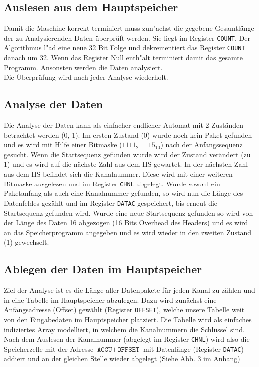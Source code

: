 \documentclass[12pt,titlepage]{article}
\begin{document}
\subsection{Auslesen aus dem Hauptspeicher}
Damit die Maschine korrekt terminiert muss zun{"a}chst die gegebene Gesamtlänge der zu Analysierenden Daten überprüft werden. Sie liegt im Register \texttt{COUNT}.
Der Algorithmus l{"a}d eine neue 32 Bit Folge und dekrementiert das Register \texttt{COUNT} danach um 32. Wenn das Register Null enth{"a}lt terminiert damit das gesamte Programm. Ansonsten werden die Daten analysiert.\\
Die Überprüfung wird nach jeder Analyse wiederholt.

 

\subsection{Analyse der Daten}
Die Analyse der Daten kann als einfacher endlicher Automat mit 2 Zuständen betrachtet werden (0, 1). Im ersten Zustand (0)
wurde noch kein Paket gefunden und es wird mit Hilfe einer Bitmaske ($1111_{2} = 15_{10}$) nach der Anfangssequenz gesucht. 
Wenn die Startsequenz gefunden wurde wird der Zustand verändert (zu 1) und es wird auf die nächste Zahl aus dem HS gewartet. 
In der nächsten Zahl aus dem HS befindet sich die Kanalnummer. Diese wird mit einer weiteren Bitmaske ausgelesen
und im Register \texttt{CHNL} abgelegt.
Wurde sowohl ein Paketanfang als auch eine Kanalnummer gefunden, so wird nun die Länge des Datenfeldes gezählt und im Register \texttt{DATAC} gespeichert, bis erneut die Startsequenz gefunden wird.
Wurde eine neue Startsequenz gefunden so wird von der Länge des Daten 16 abgezogen (16 Bits Overhead des Headers) und
es wird an das Speicherprogramm angegeben und es wird wieder in den zweiten Zustand (1) gewechselt.

\subsection{Ablegen der Daten im Hauptspeicher}
Ziel der Analyse ist es die Länge aller Datenpakete für jeden Kanal zu z{\"a}hlen und in eine Tabelle im Hauptspeicher abzulegen.
Dazu wird zunächst eine Anfangsadresse (Offset) gewählt (Register \texttt{OFFSET}), welche unsere Tabelle weit von den Eingabedaten
im Hauptspeicher platziert. Die Tabelle wird als einfaches indiziertes Array modelliert, in welchem die Kanalnummern die
Schlüssel sind. Nach dem Auslesen der Kanalnummer (abgelegt im Register \texttt{CHNL}) wird also die Speicherzelle mit der Adresse 
$\texttt{ACCU} + \texttt{OFFSET}$ mit Datenlänge (Register \texttt{DATAC}) addiert und an der gleichen Stelle wieder abgelegt (Siehe
Abb. 3 im Anhang)
\end{document}
